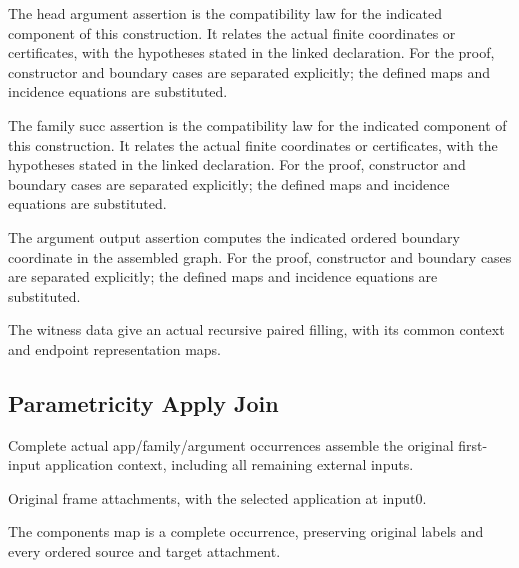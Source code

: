 The head argument assertion is the compatibility law for the indicated component of this construction. It relates the actual finite coordinates or certificates, with the hypotheses stated in the linked declaration.
For the proof, constructor and boundary cases are separated explicitly; the defined maps and incidence equations are substituted.
\par{}

The family succ assertion is the compatibility law for the indicated component of this construction. It relates the actual finite coordinates or certificates, with the hypotheses stated in the linked declaration.
For the proof, constructor and boundary cases are separated explicitly; the defined maps and incidence equations are substituted.
\par{}

The argument output assertion computes the indicated ordered boundary coordinate in the assembled graph.
For the proof, constructor and boundary cases are separated explicitly; the defined maps and incidence equations are substituted.
\par{}

The witness data give an actual recursive paired filling, with its common context and endpoint representation maps.
\par{}

\subsection{Parametricity Apply Join}
Complete actual app/family/argument occurrences assemble the original first-input application context, including all remaining external inputs.

Original frame attachments, with the selected application at input0.
\par{}

The components map is a complete occurrence, preserving original labels and every ordered source and target attachment.
\par{}


